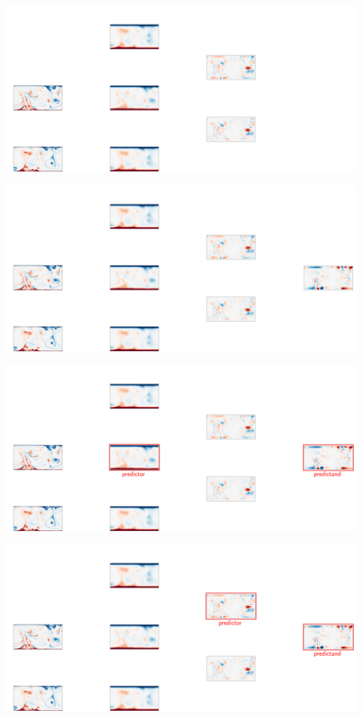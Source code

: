 \documentclass[12pt, aspectratio=169]{beamer}
\begin{document}
\begin{frame}
    \centering
    \includegraphics[width=\linewidth]{figures/method6.pdf}
\end{frame}

\begin{frame}
    \centering
    \includegraphics[width=\linewidth]{figures/method7.pdf}
\end{frame}

\begin{frame}
    \centering
    \includegraphics[width=\linewidth]{figures/method8.pdf}
\end{frame}

\begin{frame}
    \centering
    \includegraphics[width=\linewidth]{figures/method9.pdf}
\end{frame}
\end{document}
